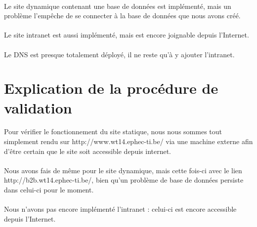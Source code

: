 \documentclass[a4paper,12pt]{article}
\begin{document}
	\paragraph{} Le site dynamique contenant une base de données est implémenté, mais un problème l'empêche de se connecter à la base de données que nous avons créé.
	\paragraph{} Le site intranet est aussi implémenté, mais est encore joignable depuis l'Internet.
	\paragraph{} Le DNS est presque totalement déployé, il ne reste qu'à y ajouter l'intranet.
	
\section{Explication de la procédure de validation}
	\paragraph{} Pour vérifier le fonctionnement du site statique, nous nous sommes tout simplement rendu sur http://www.wt14.ephec-ti.be/ via une machine externe afin d'être certain que le site soit accessible depuis internet.
	\paragraph{} Nous avons fais de même pour le site dynamique, mais cette fois-ci avec le lien http://b2b.wt14.ephec-ti.be/, bien qu'un problème de base de données persiste dans celui-ci pour le moment.
	\paragraph{} Nous n'avons pas encore implémenté l'intranet : celui-ci est encore accessible depuis l'Internet.
\end{document}
